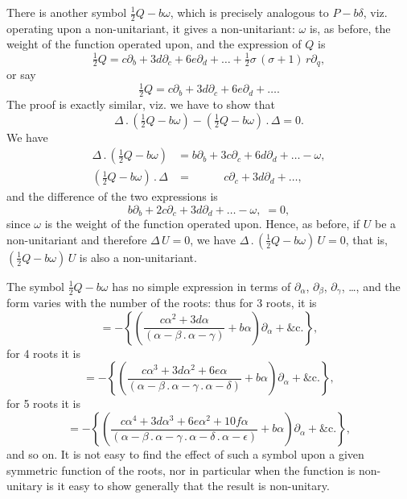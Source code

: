 \documentclass[11pt,a4paper]{book}
\begin{document}
{{{\setcounter{art}{27}
\begin{art}
There is another symbol $\frac{1}{2}Q - b\omega$, which is precisely analogous to $P - b\delta$, viz. operating upon a non-unitariant, it gives a non-unitariant: $\omega$ is, as before, the weight of the function operated upon, and the expression of $Q$ is
\[
\tfrac{1}{2}Q = c\partial_{b} + 3d\partial_{c} + 6e\partial_{d} + \ldots + \tfrac{1}{2}\sigma\,(\sigma + 1)\,r\partial_{q},
\]
or say
\[
\tfrac{1}{2}Q = c\partial_{b} + 3d\partial_{c} + 6e\partial_{d} + \ldots.
\]
The proof is exactly similar, viz. we have to show that
\[
\Delta\,.\,(\tfrac{1}{2}Q - b\omega) - (\tfrac{1}{2}Q - b\omega)\,.\,\Delta = 0.
\]
We have
\begin{align*}
\Delta\,.\,(\tfrac{1}{2}Q - b\omega) &= b\partial_{b} + 3c\partial_{c} + 6d\partial_{d} + \ldots - \omega,\\
(\tfrac{1}{2}Q - b\omega)\,.\,\Delta &= \phantom{b\partial_{b} +}\; c\partial_{c} + 3d\partial_{d} + \ldots,
\end{align*}
and the difference of the two expressions is
\[
b\partial_{b} + 2c\partial_{c} + 3d\partial_{d} + \ldots - \omega,\; = 0,
\]
since $\omega$ is the weight of the function operated upon. Hence, as before, if $U$ be a non-unitariant and therefore $\Delta\,U = 0$, we have $\Delta\,.\,(\frac{1}{2}Q - b\omega)\,U = 0$, that is, $(\frac{1}{2}Q - b\omega)\,U$ is also a non-unitariant.
\end{art}

\setcounter{art}{28}
\begin{art}
The symbol $\frac{1}{2}Q - b\omega$ has no simple expression in terms of $\partial_{\alpha}$, $\partial_{\beta}$, $\partial_{\gamma}$, \ldots, and the form varies with the number of the roots: thus for 3 roots, it is
\[
= -\left\{\left(\frac{c\alpha^{2} + 3d\alpha}{(\alpha - \beta\,.\,\alpha - \gamma)} + b\alpha\right)\partial_{\alpha} + \&\mathrm{c}.\right\},
\]
for 4 roots it is
\[
= -\left\{\left(\frac{c\alpha^{3} + 3d\alpha^{2} + 6e\alpha}{(\alpha - \beta\,.\,\alpha - \gamma\,.\,\alpha - \delta)} + b\alpha\right)\partial_{\alpha} + \&\mathrm{c}.\right\},
\]
for 5 roots it is
\[
= -\left\{\left(\frac{c\alpha^{4} + 3d\alpha^{3} + 6e\alpha^{2} + 10f\alpha}{(\alpha - \beta\,.\,\alpha - \gamma\,.\,\alpha - \delta\,.\,\alpha - \epsilon)} + b\alpha\right)\partial_{\alpha} + \&\mathrm{c}.\right\},
\]
and so on. It is not easy to find the effect of such a symbol upon a given symmetric function of the roots, nor in particular when the function is non-unitary is it easy to show generally that the result is non-unitary.
\end{art}

}}}
\end{document}
